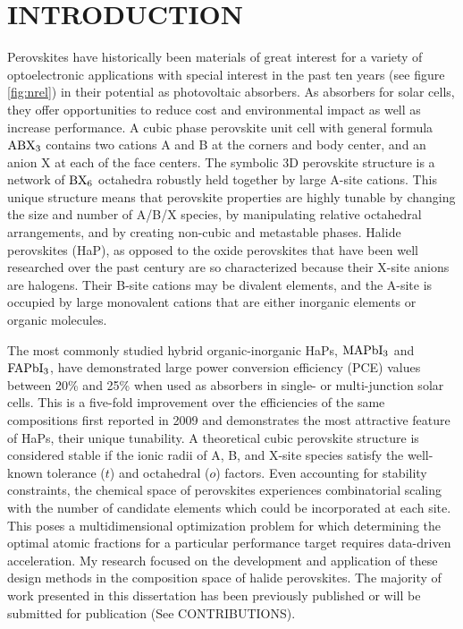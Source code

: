 \chapter{INTRODUCTION}
\label{sec:orgc6c2f23}

Perovskites have historically been materials of great interest for a variety of optoelectronic applications with special interest in the past ten years (see figure \ref{fig:nrel}) in their potential as photovoltaic absorbers.
As absorbers for solar cells, they offer opportunities to reduce cost and environmental impact as well as increase performance.
\autocite{ansari-2018-front-oppor,yin-2015-halid-perov,manser-2016-intrig-optoel,brenner-2016-hybrid-organ}
A cubic phase perovskite unit cell with general formula \(\ce{ABX3}\) contains two cations A and B at the corners and body center, and an anion X at each of the face centers.
The symbolic 3D perovskite structure is a network of \(\ce{BX6}\) octahedra robustly held together by large A-site cations.
This unique structure means that perovskite properties are highly tunable by changing the size and number of A/B/X species, by manipulating relative octahedral arrangements, and by creating non-cubic and metastable phases.
Halide perovskites (HaP), as opposed to the oxide perovskites that have been well researched over the past century are so characterized because their X-site anions are halogens.
Their B-site cations may be divalent elements, and the A-site is occupied by large monovalent cations that are either inorganic elements or organic molecules.

The most commonly studied hybrid organic-inorganic HaPs, \(\ce{MAPbI3}\) and \(\ce{FAPbI3}\), have demonstrated large power conversion efficiency (PCE) values between 20\% and 25\% when used as absorbers in single- or multi-junction solar cells.
\autocite{cui-2019-planar-p,jeong-2020-stabl-perov}
This is a five-fold improvement over the efficiencies of the same compositions first reported in 2009 and demonstrates the most attractive feature of HaPs, their unique tunability.
A theoretical cubic perovskite structure is considered stable if the ionic radii of A, B, and X-site species satisfy the well-known tolerance (\(t\)) and octahedral (\(o\)) factors.
\autocite{bartel-2019-new-toler}
Even accounting for stability constraints, the chemical space of perovskites experiences combinatorial scaling with the number of candidate elements which could be incorporated at each site.
This poses a multidimensional optimization problem for which determining the optimal atomic fractions for a particular performance target requires data-driven acceleration.
My research focused on the development and application of these design methods in the composition space of halide perovskites.
The majority of work presented in this dissertation has been previously published or will be submitted for publication (See CONTRIBUTIONS).

